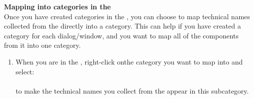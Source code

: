 
\textbf{Mapping into categories in the \gdomeditor{}}\\
\label{mapcat}
Once you have created categories in the \gdomeditor{}, you can choose to map technical names collected from the \gdaut{} directly into a category. This can help if you have created a category for each dialog/window, and you want to map all of the components from it into one category.  

\begin{enumerate}
\item When you are in the \gdomm{}, right-click onthe category you want to map into and select:\\
\\ 
to make the technical names you collect from the \gdaut{} appear in this subcategory. 
\end{enumerate}
